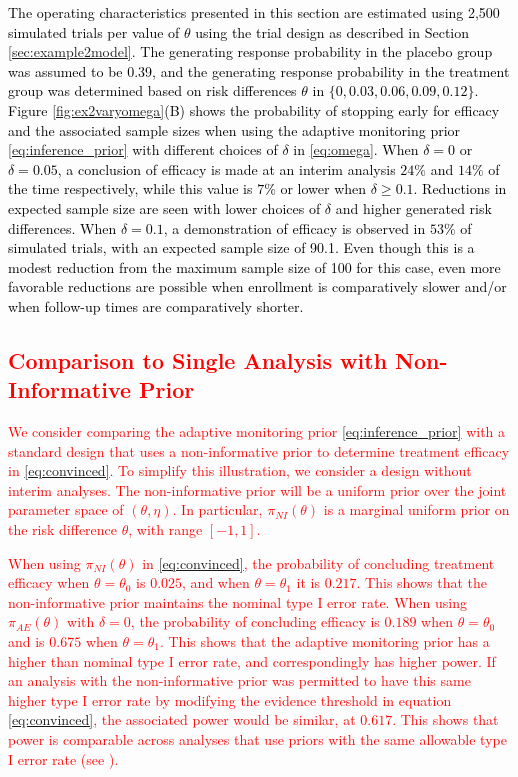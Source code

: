 \documentclass[12pt]{article}
\begin{document}
\textcolor{black}{
The operating characteristics presented in this section are estimated using 2,500 simulated trials per value of $\theta$ using the trial design as described in Section \ref{sec:example2model}. The generating response probability in the placebo group was assumed to be 0.39, and the generating response probability in the treatment group was determined based on risk differences $\theta$ in $\{0, 0.03, 0.06, 0.09, 0.12\}$. Figure \ref{fig:ex2varyomega}(B) shows the probability of stopping early for efficacy and the associated sample sizes when using the adaptive monitoring prior \eqref{eq:inference_prior} with different choices of $\delta$ in \eqref{eq:omega}. When $\delta=0$ or $\delta=0.05$, a conclusion of efficacy is made at an interim analysis $24\%$ and $14\%$ of the time respectively, while this value is $7\%$ or lower when $\delta \geq 0.1$. Reductions in expected sample size are seen with lower choices of $\delta$ and higher generated risk differences. When $\delta=0.1$, a demonstration of efficacy is observed in $53\%$ of simulated trials, with an expected sample size of 90.1. Even though this is a modest reduction from the maximum sample size of 100 for this case, even more favorable reductions are possible when enrollment is comparatively slower and/or when follow-up times are comparatively shorter.}

\textcolor{red}{
\subsection{Comparison to Single Analysis with Non-Informative Prior}\label{sec:non-informative}
We consider comparing the adaptive monitoring prior \eqref{eq:inference_prior} with a standard design that uses a non-informative prior to determine treatment efficacy in \eqref{eq:convinced}. To simplify this illustration, we consider a design without interim analyses. The non-informative prior will be a uniform prior over the joint parameter space of $(\theta,\eta)$. In particular, $\pi_{NI}(\theta)$ is a marginal uniform prior on the risk difference $\theta$, with range $[-1, 1]$.}

\textcolor{red}{
When using $\pi_{NI}(\theta)$ in \eqref{eq:convinced}, the probability of concluding treatment efficacy when $\theta=\theta_0$ is $0.025$, and when $\theta=\theta_1$ it is $0.217$. This shows that the non-informative prior maintains the nominal type I error rate. When using $\pi_{AE}(\theta)$ with $\delta=0$, the probability of concluding efficacy is $0.189$ when $\theta=\theta_0$ and is $0.675$ when $\theta=\theta_1$. This shows that the adaptive monitoring prior has a higher than nominal type I error rate, and correspondingly has higher power. If an analysis with the non-informative prior was permitted to have this same higher type I error rate by modifying the evidence threshold in equation \eqref{eq:convinced}, the associated power would be similar, at $0.617$. This shows that power is comparable across analyses that use priors with the same allowable type I error rate (see \cite{Psioda2018}).}
\end{document}
